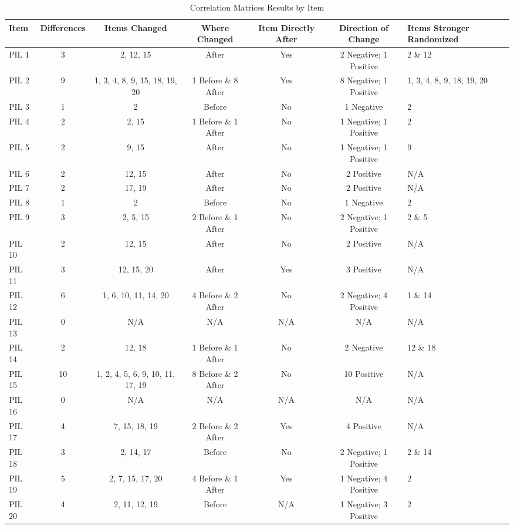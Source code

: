 \documentclass[english,man, mask]{apa6}
\theoremstyle{definition}
\theoremstyle{definition}
\theoremstyle{definition}
\theoremstyle{remark}
\begin{document}
\begin{table}[tbp]
\begin{center}
\begin{threeparttable}
\caption{\label{tab:cor-table}Correlation Matrices Results by Item}
\begin{tabular}{lcccccl}
\toprule
Item & Differences & Items Changed & Where Changed & Item Directly After & Direction of Change & Items Stronger Randomized\\
\midrule
PIL 1 & 3 & 2, 12, 15 & After & Yes & 2 Negative; 1 Positive & 2 \& 12\\
PIL 2 & 9 & 1, 3, 4, 8, 9, 15, 18, 19, 20 & 1 Before \& 8 After & Yes & 8 Negative; 1 Positive & 1, 3, 4, 8, 9, 18, 19, 20\\
PIL 3 & 1 & 2 & Before & No & 1 Negative & 2\\
PIL 4 & 2 & 2, 15 & 1 Before \& 1 After & No & 1 Negative; 1 Positive & 2\\
PIL 5 & 2 & 9, 15 & After & No & 1 Negative; 1 Positive & 9\\
PIL 6 & 2 & 12, 15 & After & No & 2 Positive & N/A\\
PIL 7 & 2 & 17, 19 & After & No & 2 Positive & N/A\\
PIL 8 & 1 & 2 & Before & No & 1 Negative & 2\\
PIL 9 & 3 & 2, 5, 15 & 2 Before \& 1 After & No & 2 Negative; 1 Positive & 2 \& 5\\
PIL 10 & 2 & 12, 15 & After & No & 2 Positive & N/A\\
PIL 11 & 3 & 12, 15, 20 & After & Yes & 3 Positive & N/A\\
PIL 12 & 6 & 1, 6, 10, 11, 14, 20 & 4 Before \& 2 After & No & 2 Negative; 4 Positive & 1 \& 14\\
PIL 13 & 0 & N/A & N/A & N/A & N/A & N/A\\
PIL 14 & 2 & 12, 18 & 1 Before \& 1 After & No & 2 Negative & 12 \& 18\\
PIL 15 & 10 & 1, 2, 4, 5, 6, 9, 10, 11, 17, 19 & 8 Before \& 2 After & No & 10 Positive & N/A\\
PIL 16 & 0 & N/A & N/A & N/A & N/A & N/A\\
PIL 17 & 4 & 7, 15, 18, 19 & 2 Before \& 2 After & Yes & 4 Positive & N/A\\
PIL 18 & 3 & 2, 14, 17 & Before & No & 2 Negative; 1 Positive & 2 \& 14\\
PIL 19 & 5 & 2, 7, 15, 17, 20 & 4 Before \& 1 After & Yes & 1 Negative; 4 Positive & 2\\
PIL 20 & 4 & 2, 11, 12, 19 & Before & N/A & 1 Negative; 3 Positive & 2\\

\end{tabular}
\end{threeparttable}
\end{center}
\end{table}
\end{document}
